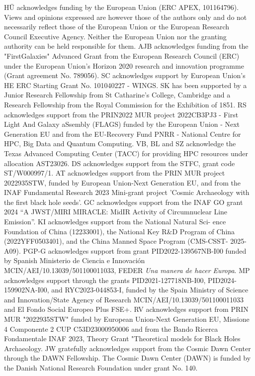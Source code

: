 \documentclass[twocolumn, fleqn]{doc_class}
\begin{document}
H\"U acknowledges funding by the European Union (ERC APEX, 101164796). Views and opinions expressed are however those of the authors only and do not necessarily reflect those of the European Union or the European Research Council Executive Agency. Neither the European Union nor the granting authority can be held responsible for them. AJB acknowledges funding from the "FirstGalaxies" Advanced Grant from the European Research Council (ERC) under the European Union’s Horizon 2020 research and innovation programme (Grant agreement No. 789056). SC acknowledges support by European Union’s HE ERC Starting Grant No. 101040227 - WINGS. SK has been supported by a Junior Research Fellowship from St Catharine's College, Cambridge and a Research Fellowship from the Royal Commission for the Exhibition of 1851. RS acknowledges support from the PRIN2022 MUR project 2022CB3PJ3 - First Light And Galaxy aSsembly (FLAGS) funded by the European Union - Next Generation EU and from the EU-Recovery Fund PNRR - National Centre for HPC, Big Data and Quantum Computing. VB, BL and SZ acknowledge the Texas Advanced Computing Center (TACC) for providing HPC resources under allocation AST23026. DS acknowledges support from the STFC, grant code ST/W000997/1. AT acknowledges support from the PRIN MUR project 2022935STW, funded by European Union-Next Generation EU, and from the INAF Fundamental Research 2023 Mini-grant project 'Cosmic Archaeology with the first black hole seeds'. GC acknowledges support from the INAF GO grant 2024 “A JWST/MIRI MIRACLE: MidIR Activity of Circumnuclear Line Emission”. KI acknowledges support from the National Natural Sci- ence Foundation of China (12233001), the National Key R\&D Program of China (2022YFF0503401), and the China Manned Space Program (CMS-CSST- 2025-A09). PGP-G acknowledges support from grant PID2022-139567NB-I00 funded by Spanish Ministerio de Ciencia e Innovaci\'on MCIN/AEI/10.13039/501100011033, FEDER {\it Una manera de hacer Europa}. MP acknowledges support through the grants PID2021-127718NB-I00, PID2024-159902NA-I00, and RYC2023-044853-I, funded by the Spain Ministry of Science and Innovation/State Agency of Research MCIN/AEI/10.13039/501100011033 and El Fondo Social Europeo Plus FSE+. RV acknowledges support from PRIN MUR "2022935STW" funded by European Union-Next Generation EU, Missione 4 Componente 2 CUP C53D23000950006 and from the Bando Ricerca Fondamentale INAF 2023, Theory Grant "Theoretical models for Black Holes Archaeology. JW gratefully acknowledges support from the Cosmic Dawn Center through the DAWN Fellowship. The Cosmic Dawn Center (DAWN) is funded by the Danish National Research Foundation under grant No. 140.
\end{document}
